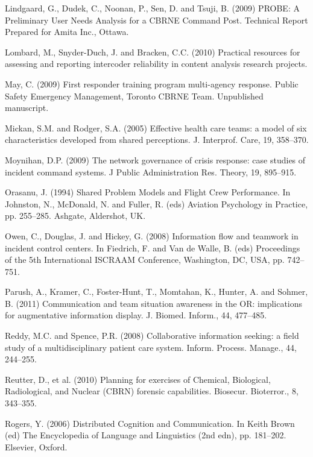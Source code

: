 \documentclass[link]{IWCOMP}
\begin{document}
\begin{thebibliography}{99}
Lindgaard, G., Dudek, C., Noonan, P., Sen,
D. and Tsuji, B. (2009) PROBE: A Preliminary User Needs
Analysis for a CBRNE Command Post. Technical Report
Prepared for Amita Inc., Ottawa.

Lombard, M., Snyder-Duch, J. and Bracken,
C.C. (2010) Practical resources for assessing and reporting
intercoder reliability in content analysis research
projects.

May, C. (2009) First responder training
program multi-agency response. Public Safety Emergency
Management, Toronto CBRNE Team. Unpublished manuscript.

Mickan, S.M. and Rodger, S.A. (2005)
Effective health care teams: a model of six characteristics
developed from shared perceptions. J. Interprof. Care, 19,
358--370.

Moynihan, D.P. (2009) The network
governance of crisis response: case studies of incident
command systems. J Public Administration Res. Theory, 19,
895--915.

Orasanu, J. (1994) Shared Problem Models
and Flight Crew Performance. In Johnston, N., McDonald, N.
and Fuller, R. (eds) Aviation Psychology in Practice, pp.
255--285. Ashgate, Aldershot, UK.

Owen, C., Douglas, J. and Hickey, G. (2008)
Information flow and teamwork in incident control centers.
In Fiedrich, F. and Van de Walle, B. (eds) Proceedings of
the 5th International ISCRAAM Conference, Washington, DC,
USA, pp. 742--751.

Parush, A., Kramer, C., Foster-Hunt, T.,
Momtahan, K., Hunter, A. and Sohmer, B. (2011)
Communication and team situation awareness in the OR:
implications for augmentative information display. J.
Biomed. Inform., 44, 477--485.

Reddy, M.C. and Spence, P.R. (2008)
Collaborative information seeking: a field study of a
multidisciplinary patient care system. Inform. Process.
Manage., 44, 244--255.

Reutter, D., et al. (2010) Planning for
exercises of Chemical, Biological, Radiological, and
Nuclear (CBRN) forensic capabilities. Biosecur. Bioterror.,
8, 343--355.

Rogers, Y. (2006) Distributed Cognition and
Communication. In Keith Brown (ed) The Encyclopedia of
Language and Linguistics (2nd edn), pp. 181--202. Elsevier,
Oxford.


\end{thebibliography}
\end{document}
